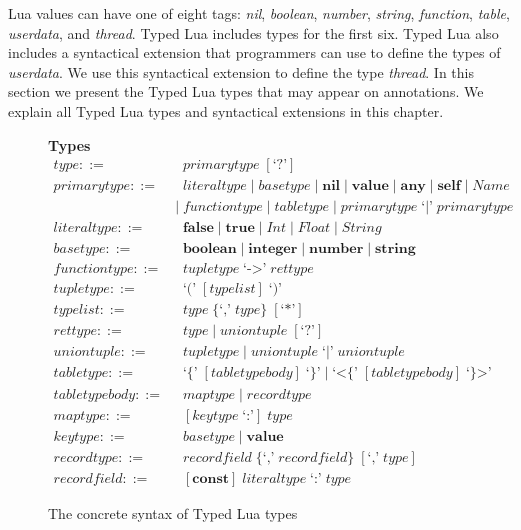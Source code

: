 Lua values can have one of eight tags:
\emph{nil}, \emph{boolean}, \emph{number}, \emph{string},
\emph{function}, \emph{table}, \emph{userdata}, and \emph{thread}.
Typed Lua includes types for the first six.
Typed Lua also includes a syntactical extension that programmers can use
to define the types of \emph{userdata}.
We use this syntactical extension to define the type \emph{thread}. 
In this section we present the Typed Lua types that may appear on annotations.
We explain all Typed Lua types and syntactical extensions in this chapter.

\begin{figure}[!ht]
\textbf{Types}\\
\dstart
\begin{align*}
\textit{type} ::= & \;\; \textit{primarytype} \; [\texttt{`?'}]\\
\textit{primarytype} ::= & \;\; \textit{literaltype} \; | \;
  \textit{basetype} \; | \;
  \textbf{nil} \; | \;
  \textbf{value} \; | \;
  \textbf{any} \; | \;
  \textbf{self} \; | \;
  \textit{Name}\\
& | \; \textit{functiontype} \; | \;
  \textit{tabletype} \; | \;
  \textit{primarytype} \; \texttt{`|'} \; \textit{primarytype}\\
\textit{literaltype} ::= & \;\; \textbf{false} \; | \;
  \textbf{true} \; | \;
  \textit{Int} \; | \;
  \textit{Float} \; | \;
  \textit{String}\\
\textit{basetype} ::= & \;\; \textbf{boolean} \; | \;
  \textbf{integer} \; | \;
  \textbf{number} \; | \;
  \textbf{string}\\
\textit{functiontype} ::= & \;\; \textit{tupletype} \; \texttt{`->'} \; \textit{rettype}\\
\textit{tupletype} ::= & \;\; \texttt{`('} \; [typelist] \; \texttt{`)'}\\
\textit{typelist} ::= & \;\; \textit{type} \; \{\texttt{`,'} \; \textit{type}\} \; [\texttt{`*'}]\\
\textit{rettype} ::= & \;\; \textit{type} \; | \;
  \textit{uniontuple} \; [\texttt{`?'}]\\
\textit{uniontuple} ::= & \;\; \textit{tupletype} \; | \;
  \textit{uniontuple} \; \texttt{`|'} \; \textit{uniontuple}\\
\textit{tabletype} ::= & \;\; \texttt{`\{'} \; [\textit{tabletypebody}] \; \texttt{`\}'} \; | \;
  \texttt{`<\{'} \; [\textit{tabletypebody}] \; \texttt{`\}>'}\\
\textit{tabletypebody} ::= & \;\; \textit{maptype} \; | \;
  \textit{recordtype}\\
\textit{maptype} ::= & \;\; [\textit{keytype} \; \texttt{`:'}] \; \textit{type}\\
\textit{keytype} ::= & \;\; \textit{basetype} \; | \;
  \textbf{value}\\
\textit{recordtype} ::= & \;\; \textit{recordfield} \; \{\texttt{`,'} \; \textit{recordfield}\} \; [\texttt{`,'} \; \textit{type}]\\
\textit{recordfield} ::= & \;\; [\textbf{const}] \; \textit{literaltype} \; \texttt{`:'} \; \textit{type}
\end{align*}
\dend
\caption{The concrete syntax of Typed Lua types}
\label{fig:types}
\end{figure}

